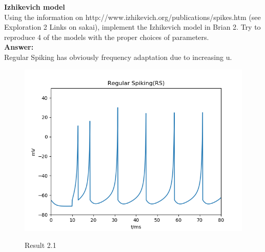 \documentclass[12pt]{article}
\begin{document}
\newpage
\textbf{Izhikevich model}
\\

Using the information on http://www.izhikevich.org/publications/spikes.htm (see Exploration 2 Links on sakai), implement the Izhikevich model in Brian 2. Try to reproduce 4 of the models with the proper choices of parameters. 
\\

\textbf{Answer:} 
\\

Regular Spiking has obviously frequency adaptation due to increasing u.
\begin{figure}[H]
\centering
    \includegraphics[width=.8\textwidth]{h2_p2_RS.png} %
  \label{img} %
  \caption{Result 2.1}
\end{figure}
\end{document}
